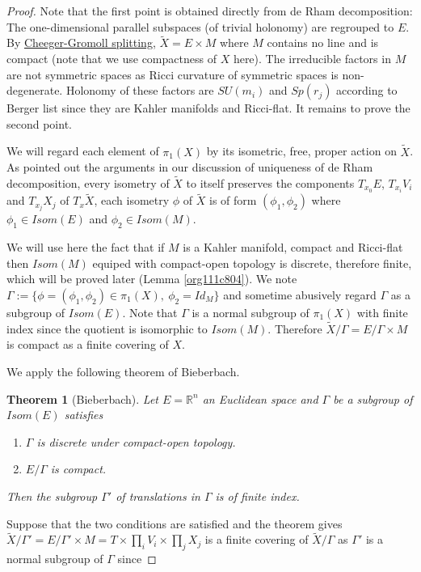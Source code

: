 \documentclass[11pt]{article}
\newtheorem{theorem}{Theorem}
\begin{document}
\begin{proof}
Note that the first point is obtained directly from de Rham decomposition: The one-dimensional
parallel subspaces (of trivial holonomy) are regrouped to \(E\). By \href{Cheeger-Gromoll-splitting.org}{Cheeger-Gromoll splitting},
\(\tilde X = E\times M\) where \(M\) contains no line and is compact (note that we use compactness of
\(X\) here). The irreducible factors in \(M\) are not symmetric spaces as Ricci curvature of
symmetric spaces is non-degenerate. Holonomy of these factors are \(SU(m_i)\) and \(Sp(r_j)\)
according to Berger list since they are Kahler manifolds and Ricci-flat. It remains to prove the
second point.

We will regard each element of \(\pi_1(X)\) by its isometric, free, proper action on \(\tilde X\). As
pointed out the arguments in our discussion of uniqueness of de Rham decomposition, every isometry
of \(\tilde X\) to itself preserves the components \(T_{x_0}E\), \(T_{x_i}V_i\) and \(T_{x_j}X_j\)
of \(T_x \tilde X\), each isometry \(\phi\) of \(\tilde X\) is of form \((\phi_1,\phi_2)\) where \(\phi_1\in
Isom(E)\) and \(\phi_2\in Isom(M)\).

We will use here the fact that if \(M\) is a Kahler manifold, compact and Ricci-flat then \(Isom(M)\)
equiped with compact-open topology is discrete, therefore finite, which will be proved later (Lemma
\ref{org111c804}). We note \(\Gamma := \{\phi = (\phi_1,\phi_2)\in \pi_1(X),\ \phi_2 = Id_M\}\) and
sometime abusively regard \(\Gamma\) as a subgroup of \(Isom(E)\). Note that \(\Gamma\) is a normal
subgroup of \(\pi_1(X)\) with finite index since the quotient is isomorphic to \(Isom(M)\). Therefore
\(\tilde X/\Gamma = E/\Gamma\times M\) is compact as a finite covering of \(X\).

We apply the following theorem of Bieberbach.
\begin{theorem}[Bieberbach]
Let \(E = \mathbb{R}^n\) an Euclidean space and \(\Gamma\) be a subgroup of \(Isom(E)\) satisfies
\begin{enumerate}
\item \(\Gamma\) is discrete under compact-open topology.
\item \(E/\Gamma\) is compact.
\end{enumerate}
Then the subgroup \(\Gamma'\) of translations in \(\Gamma\) is of finite index.
\end{theorem}

Suppose that the two conditions are satisfied and the theorem gives \(\tilde X/\Gamma' =
E/\Gamma'\times M = T\times \prod_i V_i\times \prod_j X_j\) is a finite covering of
\(\tilde X/\Gamma\) as \(\Gamma'\) is a normal subgroup of \(\Gamma\) since


\end{proof}
\end{document}

